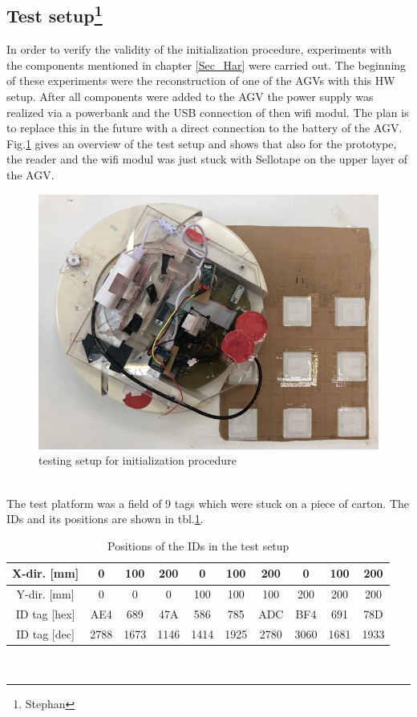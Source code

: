 \subsection[Test setup]{Test setup\footnote{Stephan}}
In order to verify the validity of the initialization procedure, experiments with the components mentioned in chapter \ref{Sec_Har} were carried out. The beginning of these experiments were the reconstruction of one of the AGVs with this HW setup. After all components were added to the AGV the power supply was realized via a powerbank and the USB connection of then wifi modul. The plan is to replace this in the future with a direct connection to the battery of the AGV. Fig.\ref{TestSetup} gives an overview of the test setup and shows that also for the prototype, the reader and the wifi modul was just stuck with Sellotape on the upper layer of the AGV.\\
\begin{figure}[!htbp]
\centering
\includegraphics[width = 14cm]{Pictures/TestSetup}
\caption{testing setup for initialization procedure}
\label{TestSetup}
\end{figure}\\
The test platform was a field of 9 tags which were stuck on a piece of carton. The IDs and its positions are shown in tbl.\ref{IDs_Setup}.\\
\begin{table}[!htbp]
\begin{tabular}{|c|c|c|c|c|c|c|c|c|c|}
\hline
X-dir. [mm] & 0    & 100  & 200  & 0    & 100  & 200  & 0    & 100  & 200  \\ \hline
Y-dir. [mm] & 0    & 0    & 0    & 100  & 100  & 100  & 200  & 200  & 200  \\ \hline
ID tag [hex]    & AE4  & 689  & 47A  & 586  & 785  & ADC  & BF4  & 691  & 78D  \\ \hline
ID tag [dec]    & 2788 & 1673 & 1146 & 1414 & 1925 & 2780 & 3060 & 1681 & 1933 \\ \hline
\end{tabular}
\caption{Positions of the IDs in the test setup}
\label{IDs_Setup}
\end{table}\\

